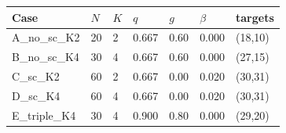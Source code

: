 \begin{tabular}{lllllll}
\toprule
Case & $N$ & $K$ & $q$ & $g$ & $\beta$ & targets \\
\midrule
A\_no\_sc\_K2 & 20 & 2 & 0.667 & 0.60 & 0.000 & (18,10) \\
B\_no\_sc\_K4 & 30 & 4 & 0.667 & 0.60 & 0.000 & (27,15) \\
C\_sc\_K2 & 60 & 2 & 0.667 & 0.00 & 0.020 & (30,31) \\
D\_sc\_K4 & 60 & 4 & 0.667 & 0.00 & 0.020 & (30,31) \\
E\_triple\_K4 & 30 & 4 & 0.900 & 0.80 & 0.000 & (29,20) \\
\bottomrule
\end{tabular}